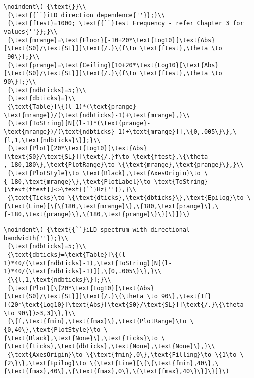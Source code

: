 \begin{appendix}
\begin{verbatim}
\noindent\( {\text{}}\\
 {\text{{``}iLD direction dependence{''}};}\\
 {\text{ftest}=1000; \text{{``}Test Frequency - refer Chapter 3 for values{''}};}\\
 {\text{mrange}=\text{Floor}[-10+20*\text{Log10}[\text{Abs}[\text{S0}/\text{SL}]]\text{/.}\{f\to \text{ftest},\theta \to -90\}];}\\
 {\text{prange}=\text{Ceiling}[10+20*\text{Log10}[\text{Abs}[\text{S0}/\text{SL}]]\text{/.}\{f\to \text{ftest},\theta \to 90\}];}\\
 {\text{ndbticks}=5;}\\
 {\text{dbticks}=}\\
 {\text{Table}[\{(l-1)*(\text{prange}-\text{mrange})/(\text{ndbticks}-1)+\text{mrange},}\\
 {\text{ToString}[N[(l-1)*(\text{prange}-\text{mrange})/(\text{ndbticks}-1)+\text{mrange}]],\{0,.005\}\},\{l,1,\text{ndbticks}\}];}\\
 {\text{Plot}[20*\text{Log10}[\text{Abs}[\text{S0}/\text{SL}]]\text{/.}f\to \text{ftest},\{\theta ,-180,180\},\text{PlotRange}\to \{\text{mrange},\text{prange}\},}\\
 {\text{PlotStyle}\to \text{Black},\text{AxesOrigin}\to \{-180,\text{mrange}\},\text{PlotLabel}\to \text{ToString}[\text{ftest}]<>\text{{``}Hz{''}},}\\
 {\text{Ticks}\to \{\text{dticks},\text{dbticks}\},\text{Epilog}\to \{\text{Line}[\{\{180,\text{mrange}\},\{180,\text{prange}\},\{-180,\text{prange}\},\{180,\text{prange}\}\}]\}]}\)
\end{verbatim}

\begin{verbatim}
\noindent\( {\text{{``}iLD spectrum with directional bandwidth{''}};}\\
 {\text{ndbticks}=5;}\\
 {\text{dbticks}=\text{Table}[\{(l-1)*40/(\text{ndbticks}-1),\text{ToString}[N[(l-1)*40/(\text{ndbticks}-1)]],\{0,.005\}\},}\\
 {\{l,1,\text{ndbticks}\}];}\\
 {\text{Plot}[\{20*\text{Log10}[\text{Abs}[\text{S0}/\text{SL}]]\text{/.}\{\theta \to 90\},\text{If}[(20*\text{Log10}[\text{Abs}[\text{S0}/\text{SL}]]\text{/.}\{\theta
\to 90\})>3,3]\},}\\
 {\{f,\text{fmin},\text{fmax}\},\text{PlotRange}\to \{0,40\},\text{PlotStyle}\to \{\text{Black},\text{None}\},\text{Ticks}\to \{\text{fticks},\text{dbticks},\text{None},\text{None}\},}\\
 {\text{AxesOrigin}\to \{\text{fmin},0\},\text{Filling}\to \{1\to \{2\}\},\text{Epilog}\to \{\text{Line}[\{\{\text{fmin},40\},\{\text{fmax},40\},\{\text{fmax},0\},\{\text{fmax},40\}\}]\}]}\)
\end{verbatim}


\end{appendix}
